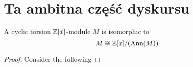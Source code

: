 \section{Ta ambitna część dyskursu}
%
%
%
%

\begin{theorem}\label{rozklad torsyjnego}
  A cyclic torsion $\operatorname{\mathbb{Z}}[x]$-module $M$ is isomorphic to 
  $$M\cong \operatorname{\mathbb{Z}}[x]/(\operatorname{Ann}(M))$$
\end{theorem}

\begin{proof}
  Consider the following 
%
\end{proof}

